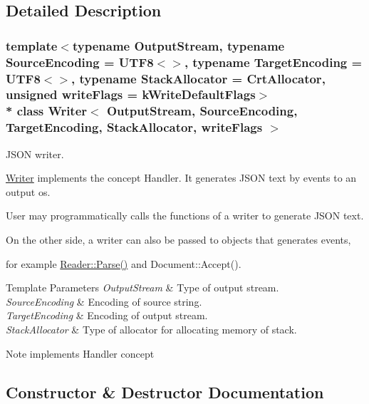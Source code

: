 \subsection{Detailed Description}
\subsubsection*{template$<$typename Output\+Stream, typename Source\+Encoding = U\+T\+F8$<$$>$, typename Target\+Encoding = U\+T\+F8$<$$>$, typename Stack\+Allocator = Crt\+Allocator, unsigned write\+Flags = k\+Write\+Default\+Flags$>$\\*
class Writer$<$ Output\+Stream, Source\+Encoding, Target\+Encoding, Stack\+Allocator, write\+Flags $>$}

J\+S\+ON writer. 

\hyperlink{classWriter}{Writer} implements the concept Handler. It generates J\+S\+ON text by events to an output os.

User may programmatically calls the functions of a writer to generate J\+S\+ON text.

On the other side, a writer can also be passed to objects that generates events,

for example \hyperlink{classGenericReader_a0c450620d14ff1824e58bb7bd9b42099}{Reader\+::\+Parse()} and Document\+::\+Accept().


\begin{DoxyTemplParams}{Template Parameters}
{\em Output\+Stream} & Type of output stream. \\
\hline
{\em Source\+Encoding} & Encoding of source string. \\
\hline
{\em Target\+Encoding} & Encoding of output stream. \\
\hline
{\em Stack\+Allocator} & Type of allocator for allocating memory of stack. \\
\hline
\end{DoxyTemplParams}
\begin{DoxyNote}{Note}
implements Handler concept 
\end{DoxyNote}


\subsection{Constructor \& Destructor Documentation}
